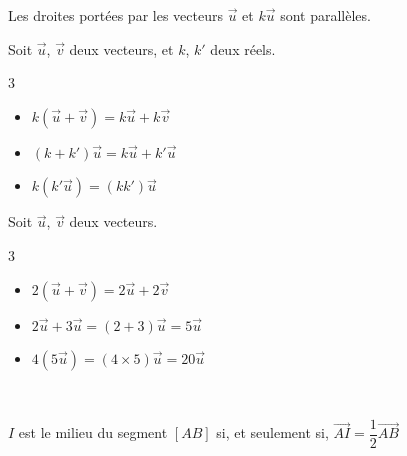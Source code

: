 \begin{Remarque}
Les droites portées par les vecteurs $\overrightarrow{u}$ et $k\overrightarrow{u}$ sont parallèles.
\end{Remarque}



\begin{Propriété}
Soit $\overrightarrow{u}$, $\overrightarrow{v}$ deux vecteurs, et $k$, $k'$ deux réels.
\vspace{-0.5cm}
\begin{multicols}{3}
\begin{itemize}[label=\textcolor{Couleur2}{$\bullet$}]
\item $k(\overrightarrow{u}+\overrightarrow{v})=k\overrightarrow{u}+k\overrightarrow{v}$
\item $(k+k')\overrightarrow{u}=k\overrightarrow{u}+k'\overrightarrow{u}$
\item $k(k'\overrightarrow{u})=(kk')\overrightarrow{u}$
\end{itemize}
\end{multicols}
\end{Propriété}

\begin{Exemple}
Soit $\overrightarrow{u}$, $\overrightarrow{v}$ deux vecteurs.
\vspace{-0.5cm}
\begin{multicols}{3}
\begin{itemize}[label=\textcolor{Couleur8}{$\bullet$}]
\item $2(\overrightarrow{u}+\overrightarrow{v})=2\overrightarrow{u}+2\overrightarrow{v}$
\item $2\overrightarrow{u}+3\overrightarrow{u}=(2+3)\overrightarrow{u}=5\overrightarrow{u}$
\item $4(5\overrightarrow{u})=(4\times 5)\overrightarrow{u}=20\overrightarrow{u}$
\end{itemize}
\end{multicols}
\end{Exemple}

\begin{Propriété} $ $\\
\vspace{-0.5cm}
\begin{minipage}[c]{0.6\linewidth}
$I$ est le milieu du segment $[AB]$ si, et seulement si, $\overrightarrow{AI}=\dfrac{1}{2}\overrightarrow{AB}$
\end{minipage} \hfill
\begin{minipage}[c]{0.3\linewidth}
\end{minipage}
\vspace{0.5cm}
\end{Propriété}

